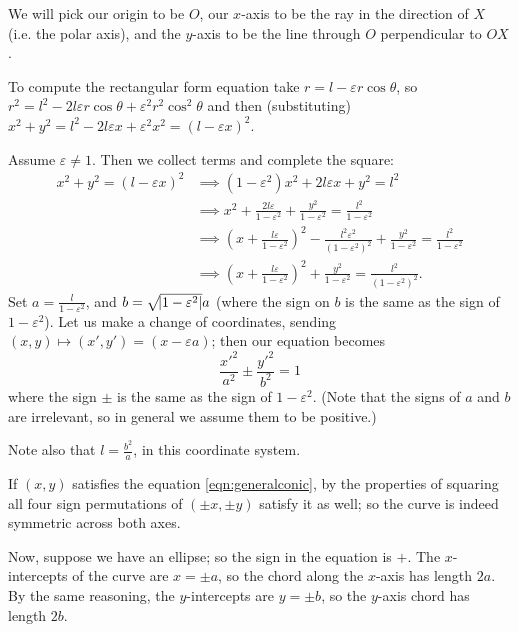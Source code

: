\documentclass[a4paper,leqno,10pt]{article}
\theoremstyle{exercise}
\theoremstyle{plain}
\theoremstyle{definition}
\theoremstyle{remark}
\begin{document}
We will pick our origin to be $ O $, our $ x$-axis to be the ray in the direction of $ X $ (i.e. the polar axis), and the $ y$-axis to be
the line through $ O $ perpendicular to $ OX $.

To compute the rectangular form equation take $ r = l - \varepsilon r \cos \theta $, so $ r^2 = l^2 - 2l\varepsilon r \cos\theta + \varepsilon^2 r^2 \cos^2\theta $
and then (substituting) $ x^2 + y^2 = l^2 - 2l\varepsilon x + \varepsilon^2 x^2 = (l - \varepsilon x)^2 $.

Assume $ \varepsilon \neq 1 $. Then we collect terms and complete the square:
\begin{align*}
  x^2 + y^2 = (l - \varepsilon x)^2 &\implies (1 - \varepsilon^2)x^2 + 2l\varepsilon x + y^2 = l^2\\
                                    &\implies x^2 + \frac{2l\varepsilon}{1 - \varepsilon^2} + \frac{y^2}{1 - \varepsilon^2} = \frac{l^2}{1 - \varepsilon^2}\\
                                    &\implies \left(x + \frac{l\varepsilon}{1 - \varepsilon^2}\right)^2 - \frac{l^2 \varepsilon^2}{(1 - \varepsilon^2)^2} + \frac{y^2}{1 - \varepsilon^2} = \frac{l^2}{1 - \varepsilon^2}\\
                                    &\implies \left(x + \frac{l\varepsilon}{1 - \varepsilon^2}\right)^2 + \frac{y^2}{1 - \varepsilon^2} = \frac{l^2}{(1 - \varepsilon^2)^2}.
\end{align*}
Set $ a = \frac{l}{1 - \varepsilon^2} $, and $ b = \sqrt{\abs{1 - \varepsilon^2}}a $ (where the sign on $ b $ is the same as the sign of $ 1 - \varepsilon^2 $).
Let us make a change of coordinates, sending $ (x,y) \mapsto (x',y') = (x - \varepsilon a) $; then our equation becomes
\begin{equation}\label{eqn:generalconic}
  \frac{{x'}^2}{a^2} \pm \frac{{y'}^2}{b^2} = 1
\end{equation}
where the sign $ \pm $ is the same as the sign of $ 1 - \varepsilon^2 $. (Note that the signs of $ a $ and $ b $ are irrelevant, so in general we
assume them to be positive.)

Note also that $ l = \frac{b^2}{a} $, in this coordinate system.

If $ (x,y) $ satisfies the equation \ref{eqn:generalconic}, by the properties of squaring all four sign permutations of $ (\pm x , \pm y) $ satisfy it as
well; so the curve is indeed symmetric across both axes.

Now, suppose we have an ellipse; so the sign in the equation is $ + $. The $ x$-intercepts of the curve are $ x = \pm a $, so the chord along
the $ x$-axis has length $ 2a $. By the same reasoning, the $ y$-intercepts are $ y = \pm b $, so the $ y$-axis chord has length $ 2b $.
\end{document}
